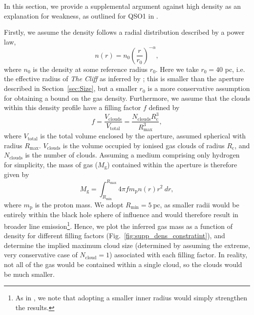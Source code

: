\documentclass[fleqn,usenatbib]{mnras}
\newcommand{\cliff}{\textit{The Cliff}\xspace}
\begin{document}
In this section, we provide a supplemental argument against high density as an explanation for \OIIIL weakness, as outlined for QSO1 in \cite{Maiolino2025_QSO1}.

Firstly, we assume the density follows a radial distribution described by a power law,
\begin{equation}
n(r) = n_0\left(\frac{r}{r_0}\right)^{-\alpha},
\label{eq:densprof}
\end{equation}
where $n_0$ is the density at some reference radius $r_0$. Here we take $r_0 = 40$ pc, i.e. the effective radius of \cliff as inferred by \cite{deGraaff2025}; this is smaller than the aperture described in Section~\ref{sec:Size}, but a smaller $r_0$ is a more conservative assumption for obtaining a bound on the gas density. Furthermore, we assume that the clouds within this density profile have a filling factor $f$ defined by
\begin{equation}
    f = \frac{V_\mathrm{clouds}}{V_\mathrm{total}} = \frac{N_\mathrm{clouds}R_\mathrm{c}^3}{R^3_\mathrm{max}},
    \label{eq:fillfactor}
\end{equation}
where $V_\mathrm{total}$ is the total volume enclosed by the aperture, assumed spherical with radius $R_\mathrm{max}$. $V_\mathrm{clouds}$ is the volume occupied by ionised gas clouds of radius $R_\mathrm{c}$, and $N_\mathrm{clouds}$ is the number of clouds. Assuming a medium comprising only hydrogen for simplicity, the mass of gas ($M_\mathrm{g}$) contained within the aperture is therefore given by
\begin{equation}
    M_\mathrm{g} = \int_{R_\mathrm{min}}^{R_\mathrm{max}}4\pi fm_\mathrm{p}n(r)r^2 \ dr,
    \label{eq:gasmass}
\end{equation}
where $m_\mathrm{p}$ is the proton mass. We adopt $R_\mathrm{min} = 5 \ \mathrm{pc}$, as smaller radii would be entirely within the black hole sphere of influence and would therefore result in broader line emission\footnote{As in \cite{Maiolino2025_QSO1}, we note that adopting a smaller inner radius would simply strengthen the results.}. Hence, we plot the inferred gas mass as a function of density for different filling factors (Fig.~\ref{fig:supp_dens_constratint}), and determine the implied maximum cloud size (determined by assuming the extreme, very conservative case of $N_\mathrm{cloud} = 1$) associated with each filling factor. In reality, not all of the gas would be contained within a single cloud, so the clouds would be much smaller.
\end{document}
